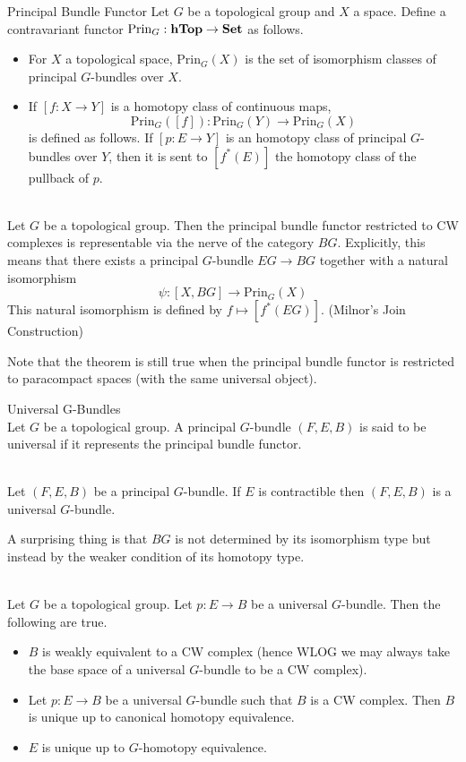\documentclass[a4paper]{article}
\begin{document}
\begin{defn}{Principal Bundle Functor}{} Let $G$ be a topological group and $X$ a space. Define a contravariant functor $\text{Prin}_G:\bold{hTop}\to\bold{Set}$ as follows. 
\begin{itemize}
\item For $X$ a topological space, $\text{Prin}_G(X)$ is the set of isomorphism classes of principal $G$-bundles over $X$. 
\item If $[f:X\to Y]$ is a homotopy class of continuous maps, $$\text{Prin}_G([f]):\text{Prin}_G(Y)\to\text{Prin}_G(X)$$ is defined as follows. If $[p:E\to Y]$ is an homotopy class of principal $G$-bundles over $Y$, then it is sent to $[f^\ast(E)]$ the homotopy class of the pullback of $p$. 
\end{itemize}
\end{defn}

\begin{prp}{}{}\\
Let $G$ be a topological group. Then the principal bundle functor restricted to CW complexes is representable via the nerve of the category $BG$. Explicitly, this means that there exists a principal $G$-bundle $EG\to BG$ together with a natural isomorphism $$\psi:[X,BG]\to\text{Prin}_G(X)$$ This natural isomorphism is defined by $f\mapsto[f^\ast(EG)]$. (Milnor's Join Construction)
\end{prp}

Note that the theorem is still true when the principal bundle functor is restricted to paracompact spaces (with the same universal object). 

\begin{defn}{Universal G-Bundles}{}\\
Let $G$ be a topological group. A principal $G$-bundle $(F,E,B)$ is said to be universal if it represents the principal bundle functor. 
\end{defn}

\begin{thm}{}{}\\
Let $(F,E,B)$ be a principal $G$-bundle. If $E$ is contractible then $(F,E,B)$ is a universal $G$-bundle. 
\end{thm}

A surprising thing is that $BG$ is not determined by its isomorphism type but instead by the weaker condition of its homotopy type. 

\begin{prp}{}{}\\
Let $G$ be a topological group. Let $p:E\to B$ be a universal $G$-bundle. Then the following are true. 
\begin{itemize}
\item $B$ is weakly equivalent to a CW complex (hence WLOG we may always take the base space of a universal $G$-bundle to be a CW complex). 
\item Let $p:E\to B$ be a universal $G$-bundle such that $B$ is a CW complex. Then $B$ is unique up to canonical homotopy equivalence. 
\item $E$ is unique up to $G$-homotopy equivalence. 
\end{itemize}
\end{prp}
\end{document}
